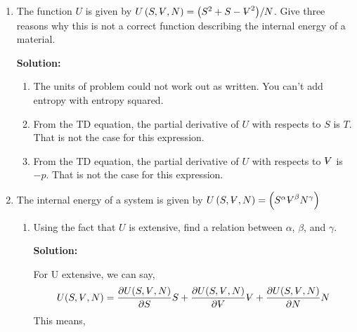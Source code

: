 \documentclass[10pt]{article}
\newenvironment{Solution}
    {\textbf{Solution:}
    
    \vspace{5mm}
    \begin{tcolorbox}
    }
    {
    \end{tcolorbox}
    \vspace{5mm}
    }
\newcommand{\vol}{{\ooalign{\hfil$V$\hfil\cr\kern0.08em--\hfil\cr}}}
\begin{document}

\begin{enumerate}



\item The function  $U$ is given by $U\left(S,\vol,N\right) = {\left(S^2+S-\vol^2\right)}/{N}$. Give three reasons why this is not a correct function describing the internal energy of a material.


\begin{Solution}
\begin{enumerate}
    \item The units of problem could not work out as written. You can't add entropy with entropy squared.
    \item From the TD equation, the partial derivative of $U$ with respects to $S$ is $T$. That is not the case for this expression.
    \item From the TD equation, the partial derivative of $U$ with respects to $\vol$ is $-p$. That is not the case for this expression.

\end{enumerate}
\end{Solution}

\item The internal energy of a system is given by  $U\left(S,\vol,N\right) = {\left(S^\alpha \vol^\beta N^\gamma \right)}$
\begin{enumerate}
    \item Using the fact that $U$ is extensive, find a relation between $\alpha$, $\beta$, and $\gamma$.
    
    \begin{Solution}
    For U extensive, we can say,
    \begin{equation}\label{extensive}
    U(S, \vol, N)=\frac{\partial U(S, \vol, N)}{\partial S} S + \frac{\partial U(S, \vol, N)}{\partial \vol} \vol + \frac{\partial U(S, \vol, N)}{\partial N} N
    \end{equation}
    This means,
    

\end{Solution}
\end{enumerate}
\end{enumerate}
\end{document}
